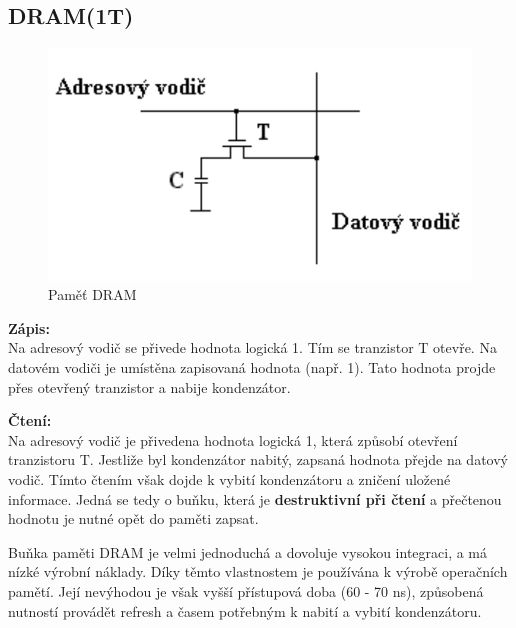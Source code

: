 \subsection{DRAM(1T)}
   \begin{figure}[h]
   \begin{center}
     \includegraphics[scale=0.4]{images/DRAM.png}
   \end{center}
   \caption{Paměť DRAM}
  \end{figure}

\textbf{Zápis:}\\ 
Na adresový vodič se přivede hodnota logická 1. Tím se tranzistor T otevře. Na datovém vodiči je umístěna zapisovaná hodnota (např. 1). Tato hodnota projde přes otevřený tranzistor a nabije kondenzátor.  

\textbf{Čtení:}\\
Na adresový vodič je přivedena hodnota logická 1, která způsobí otevření tranzistoru T. Jestliže byl kondenzátor nabitý, zapsaná hodnota přejde na datový vodič. Tímto
čtením však dojde k vybití kondenzátoru a zničení uložené informace. Jedná se tedy o buňku, která je \textbf{destruktivní při čtení} a přečtenou hodnotu je nutné opět do paměti zapsat.

Buňka paměti DRAM je velmi jednoduchá a dovoluje vysokou integraci, a má nízké výrobní
náklady. Díky těmto vlastnostem je používána k výrobě operačních pamětí. Její nevýhodou je však vyšší přístupová doba (60 - 70 ns), způsobená nutností provádět refresh a časem potřebným k nabití a vybití kondenzátoru.

